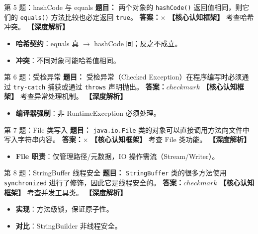 ﻿\documentclass[12pt, a4paper]{ctexart}
\begin{document}
\begin{bluebox}{第 5 题：hashCode 与 equals}
	\textbf{题目：} 两个对象的 \texttt{hashCode()} 返回值相同，则它们的 \texttt{equals()} 方法比较也必定返回 \texttt{true}。
	\textbf{答案：$\times$}
	\textbf{【核心认知框架】} 考查哈希冲突。
	\textbf{【深度解析】}
	\begin{itemize}[leftmargin=*, nosep]
		\item \textbf{哈希契约}：equals 真 $\rightarrow$ hashCode 同；反之不成立。
		\item \textbf{冲突}：不同对象可能哈希值相同。
	\end{itemize}
\end{bluebox}

\begin{bluebox}{第 6 题：受检异常}
	\textbf{题目：} 受检异常（Checked Exception）在程序编写时必须通过 \texttt{try-catch} 捕获或通过 \texttt{throws} 声明抛出。
	\textbf{答案：$checkmark$}
	\textbf{【核心认知框架】} 考查异常处理机制。
	\textbf{【深度解析】}
	\begin{itemize}[leftmargin=*, nosep]
		\item \textbf{编译器强制}：非 RuntimeException 必须处理。
	\end{itemize}
\end{bluebox}

\begin{bluebox}{第 7 题：File 类写入}
	\textbf{题目：} \texttt{java.io.File} 类的对象可以直接调用方法向文件中写入字符串内容。
	\textbf{答案：$\times$}
	\textbf{【核心认知框架】} 考查 File 类功能。
	\textbf{【深度解析】}
	\begin{itemize}[leftmargin=*, nosep]
		\item \textbf{File 职责}：仅管理路径/元数据，IO 操作需流（Stream/Writer）。
	\end{itemize}
\end{bluebox}

\begin{bluebox}{第 8 题：StringBuffer 线程安全}
	\textbf{题目：} \texttt{StringBuffer} 类的很多方法使用 \texttt{synchronized} 进行了修饰，因此它是线程安全的。
	\textbf{答案：$checkmark$}
	\textbf{【核心认知框架】} 考查并发工具类。
	\textbf{【深度解析】}
	\begin{itemize}[leftmargin=*, nosep]
		\item \textbf{实现}：方法级锁，保证原子性。
		\item \textbf{对比}：StringBuilder 非线程安全。
	\end{itemize}
\end{bluebox}
\end{document}
